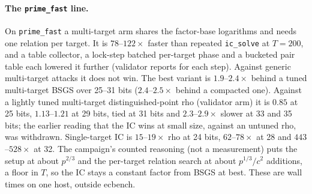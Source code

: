 \paragraph{The \texttt{prime\_fast} line.} On \texttt{prime\_fast} a
multi-target arm shares the factor-base logarithms and needs one relation
per target. It is $78$--$122\times$ faster than repeated \texttt{ic\_solve}
at $T=200$, and a table collector, a lock-step batched per-target phase and a
bucketed pair table each lowered it further (validator reports for each
step). Against generic multi-target attacks it does not win. The best
variant is $1.9$--$2.4\times$ behind a tuned multi-target BSGS over 25--31
bits ($2.4$--$2.5\times$ behind a compacted one). Against a lightly tuned
multi-target distinguished-point rho (validator arm) it is $0.85$ at 25 bits,
$1.13$--$1.21$ at 29 bits, tied at 31 bits and $2.3$--$2.9\times$ slower at 33
and 35 bits; the earlier reading that the IC wins at small size, against an
untuned rho, was withdrawn. Single-target IC is $15$--$19\times$ rho at 24
bits, $62$--$78\times$ at 28 and $443$--$528\times$ at 32. The campaign's
counted reasoning (not a measurement) puts the setup at about $p^{2/3}$ and
the per-target relation search at about $p^{1/3}/c^2$ additions, a floor in
$T$, so the IC stays a constant factor from BSGS at best. These are wall
times on one host, outside ecbench.

